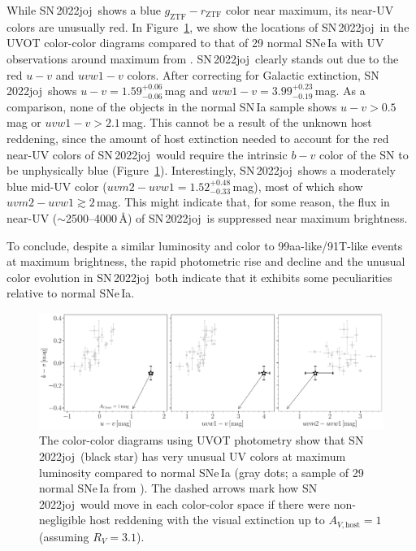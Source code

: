 \documentclass[twocolumn]{aastex631}
\newcommand{\sn}{SN\,2022joj}
\begin{document}
\begin{CJK*}{UTF8}{gbsn}
While \sn\ shows a blue $g_\mathrm{ZTF}-r_\mathrm{ZTF}$ color near maximum, its near-UV colors are unusually red. In Figure~\ref{fig:UVOT}, we show the locations of \sn\ in the UVOT color-color diagrams compared to that of 29 normal SNe\,Ia with UV observations around maximum from \citet{Brown_2018}. \sn\ clearly stands out due to the red $u-v$ and $uvw1-v$ colors. After correcting for Galactic extinction, \sn\ shows $u-v=1.59^{+0.06}_{-0.06}$\,mag and $uvw1 - v=3.99^{+0.23}_{-0.19}$\,mag. As a comparison, none of the objects in the normal SN\,Ia sample shows $u-v>0.5$\,mag or $uvw1 - v>2.1$\,mag. This cannot be a result of the unknown host reddening, since the amount of host extinction needed to account for the red near-UV colors of \sn\ would require the intrinsic $b-v$ color of the SN to be unphysically blue (Figure~\ref{fig:UVOT}). Interestingly, \sn\ shows a moderately blue mid-UV color ($uvm2-uvw1=1.52^{+0.48}_{-0.33}$\,mag), most of which show $uvm2-uvw1\gtrsim2$\,mag. This might indicate that, for some reason, the flux in near-UV ($\sim$2500--4000\,\r{A}) of \sn\ is suppressed near maximum brightness.

To conclude, despite a similar luminosity and color to 99aa-like/91T-like events at maximum brightness, the rapid photometric rise and decline and the unusual color evolution in \sn\ both indicate that it exhibits some peculiarities relative to normal SNe\,Ia.

\begin{figure}
    \centering
    \includegraphics[width=\linewidth]{UVOT_colors.pdf}
    \caption{The color-color diagrams using UVOT photometry show that \sn\ (black star) has very unusual UV colors at maximum luminosity compared to normal SNe\,Ia (gray dots; a sample of 29 normal SNe\,Ia from \citealp{Brown_2018}). The dashed arrows mark how \sn\ would move in each color-color space if there were non-negligible host reddening with the visual extinction up to $A_{V,\mathrm{host}}=1$ (assuming $R_V=3.1$). 
    }
    \label{fig:UVOT}
\end{figure}



\end{CJK*}
\end{document}
